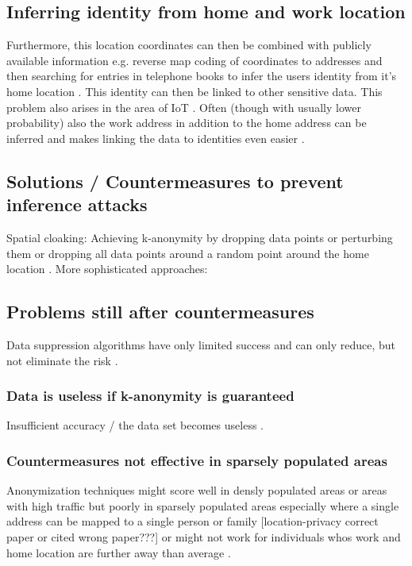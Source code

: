 \subsection{Inferring identity from home and work location}
Furthermore, this location coordinates can then be combined with publicly available information e.g. reverse map coding of coordinates to addresses and then searching for entries in telephone books to infer the users identity from it's home location \parencite{krumm, privacy-home-work-pairs, hoh2006enhancing}. This identity can then be linked to other sensitive data. This problem also arises in the area of IoT \parencite{iot, hoh2006enhancing}.
Often (though with usually lower probability) also the work address in addition to the home address can be inferred and makes linking the data to identities even easier \parencite{cellphone, privacy-home-work-pairs}.

\subsection{Solutions / Countermeasures to prevent inference attacks}
Spatial cloaking: Achieving k-anonymity by dropping data points or perturbing them or dropping all data points around a random point around the home location \parencite{krumm}.
More sophisticated approaches: \parencite{time-to-confusion}

\subsection{Problems still after countermeasures}
Data suppression algorithms have only limited success and can only reduce, but not eliminate the risk \parencite{hoh2006enhancing}.

\subsubsection{Data is useless if k-anonymity is guaranteed}
Insufficient accuracy / the data set becomes useless \parencite{krumm, cellphone, k-anonymity-old, k-anonymity, k-anonymity-achieving}.

\subsubsection{Countermeasures not effective in sparsely populated areas}
Anonymization techniques might score well in densly populated areas or areas with high traffic but poorly in sparsely populated areas especially where a single address can be mapped to a single person or family \parencite{time-to-confusion, location-privacy, hoh2006enhancing} [location-privacy correct paper or cited wrong paper???] or might not work for individuals whos work and home location are further away than average \parencite{privacy-home-work-pairs}.

